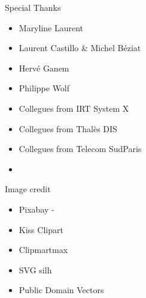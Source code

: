 



\begin{frame}{Special Thanks}
    \begin{multicols}{2}
        \begin{itemize}
            \item Maryline Laurent
            \item Laurent Castillo \& Michel Béziat
            \item Hervé Ganem
            \item Philippe Wolf
            \item Collegues from IRT System X
            \item Collegues from Thalès DIS
            \item Collegues from Telecom SudParis
            \item 
        \end{itemize}
    \end{multicols}
\end{frame}

\begin{frame}{Image credit}
    \begin{multicols}{2}
        \begin{itemize}
            \item Pixabay - \url{}
            \item Kiss Clipart 
            \item Clipmartmax
            \item SVG silh
            \item Public Domain Vectors
        \end{itemize}
    \end{multicols}
\end{frame}